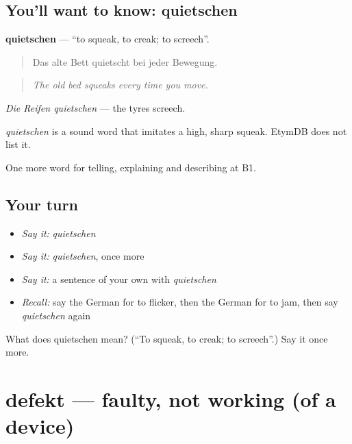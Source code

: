 \subsection*{You'll want to know: quietschen}
\textbf{quietschen} — \textquotedblleft{}to squeak, to creak; to screech\textquotedblright{}.

\begin{quote}
Das alte Bett quietscht bei jeder Bewegung.
\end{quote}

\begin{quote}
\emph{The old bed squeaks every time you move.}
\end{quote}

\emph{Die Reifen quietschen} — the tyres screech.

\begin{cousinweb}
\emph{quietschen} is a sound word that imitates a high, sharp squeak. EtymDB does not list it.
\end{cousinweb}

\begin{grammarlens}[title={What you've built}]
One more word for telling, explaining and describing at B1.
\end{grammarlens}

\subsection*{Your turn}
\begin{itemize}
\raggedright
  \item \emph{Say it:} \emph{quietschen}
  \item \emph{Say it:} \emph{quietschen}, once more
  \item \emph{Say it:} a sentence of your own with \emph{quietschen}
  \item \emph{Recall:} say the German for to flicker, then the German for to jam, then say \emph{quietschen} again
\end{itemize}

\begin{tcolorbox}[breakable,colback=teal!4,colframe=teal!35!black,title={Before you move on}]
What does quietschen mean? (\textquotedblleft{}To squeak, to creak; to screech\textquotedblright{}.) Say it once more.
\end{tcolorbox}
\section[defekt]{defekt — faulty, not working (of a device)}

